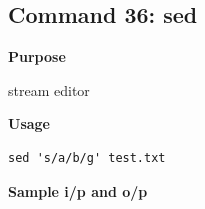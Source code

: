 \subsection{Command 36: sed} 
\textbf{Purpose}
\begin{flushleft}
 stream editor
\end{flushleft}
\textbf{Usage}
\begin{verbatim}
sed 's/a/b/g' test.txt
\end{verbatim}
\textbf{Sample i/p and o/p}
\begin{figure}[H] 
\end{figure}
